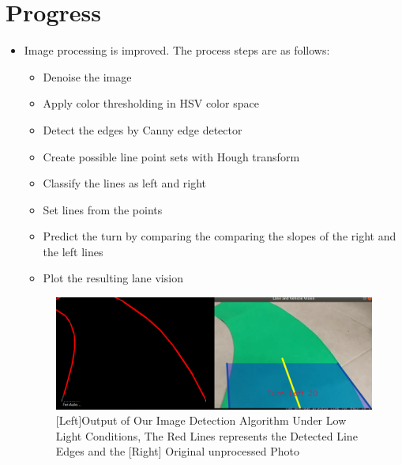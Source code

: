 \documentclass[a4paper,12pt]{article}
\begin{document}
\section{Progress}
\begin{itemize}
	\item Image processing is improved. The process steps are as follows:
		\begin{itemize}
			\item Denoise the image
			\item Apply color thresholding in HSV color space
			\item Detect the edges by Canny edge detector
			\item Create possible line point sets with Hough transform
			\item Classify the lines as left and right
			\item Set lines from the points
			\item Predict the turn by comparing the comparing the slopes of the right and the left lines 
			\item Plot the resulting lane vision
		\end{itemize}
	\begin{figure}[H]
	\center
	\setlength{\unitlength}{\textwidth} 
	\includegraphics[width=0.75\unitlength]{laneDetection}
	\caption{\label{fig:LaneDetection} [Left]Output of Our Image Detection Algorithm Under Low Light Conditions, The Red Lines represents the Detected Line Edges  and the [Right] Original unprocessed Photo }
	\end{figure}
		

\end{itemize}
\end{document}
